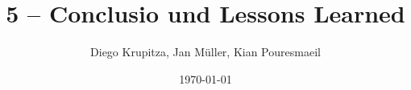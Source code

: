 \usepackage[utf8]{inputenc}
\usepackage[T1]{fontenc}

\usepackage[ngerman]{isodate, babel}
\usepackage[german=quotes]{csquotes}

\usepackage[hyphens]{url}
\usepackage[]{hyperref}
\hypersetup{colorlinks, citecolor=black, linkcolor=black, urlcolor=black}

\usepackage{titling}
\title{5 – Conclusio und Lessons Learned}
\author{Diego Krupitza, Jan Müller, Kian Pouresmaeil}
\date{\today}

\usepackage{fancyhdr}
\pagestyle{fancy}
\fancyhead{} %
\renewcommand{\headrulewidth}{0pt} %
\fancyfoot{} %
\fancyfoot[LE,RO]{\thepage} %
\fancyfoot[RE,LO]{\thetitle}
